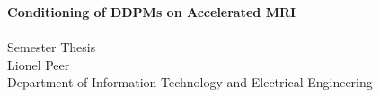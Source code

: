 %

\begin{titlepage}

    \thispagestyle{empty}




    \vspace*{2cm}
    \begin{center}
        \Huge{\textbf{Conditioning of DDPMs on Accelerated MRI}\\}
        \LARGE{\textbf{}\\[1cm]}
        \vspace{5pt}
        \large{Semester Thesis\\[0.8cm]}
        \LARGE{Lionel Peer\\}
        \normalsize{Department of Information Technology and Electrical Engineering}
    \end{center}

    \begin{center}





\end{center}
\end{titlepage}
